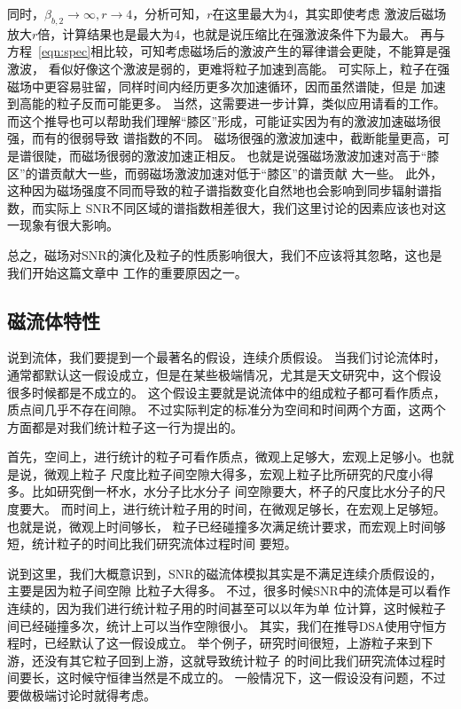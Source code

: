 同时，$\beta_{b,2}\to \infty, r\to4$，分析可知，$r$在这里最大为4，其实即使考虑
激波后磁场放大$r$倍，计算结果也是最大为4，也就是说压缩比在强激波条件下为最大。
再与方程~\ref{eqn:spec}相比较，可知考虑磁场后的激波产生的幂律谱会更陡，不能算是强激波，
看似好像这个激波是弱的，更难将粒子加速到高能。
可实际上，粒子在强磁场中更容易驻留，同样时间内经历更多次加速循环，因而虽然谱陡，但是
加速到高能的粒子反而可能更多。
当然，这需要进一步计算，类似应用请看\citet{Zirakashvili2018}的工作。
而这个推导也可以帮助我们理解“膝区”形成，可能证实因为有的激波加速磁场很强，而有的很弱导致
谱指数的不同。
磁场很强的激波加速中，截断能量更高，可是谱很陡，而磁场很弱的激波加速正相反。
也就是说强磁场激波加速对高于“膝区”的谱贡献大一些，而弱磁场激波加速对低于“膝区”的谱贡献
大一些。
此外，这种因为磁场强度不同而导致的粒子谱指数变化自然地也会影响到同步辐射谱指数，而实际上
SNR不同区域的谱指数相差很大\citep{Leahy2005, Tian2005}，我们这里讨论的因素应该也对这
一现象有很大影响。

总之，磁场对SNR的演化及粒子的性质影响很大，我们不应该将其忽略，这也是我们开始这篇文章中
工作的重要原因之一。

\subsection{磁流体特性}
说到流体，我们要提到一个最著名的假设，连续介质假设。
当我们讨论流体时，通常都默认这一假设成立，但是在某些极端情况，尤其是天文研究中，这个假设
很多时候都是不成立的。
这个假设主要就是说流体中的组成粒子都可看作质点，质点间几乎不存在间隙。
不过实际判定的标准分为空间和时间两个方面，这两个方面都是对我们统计粒子这一行为提出的。

首先，空间上，进行统计的粒子可看作质点，微观上足够大，宏观上足够小。也就是说，微观上粒子
尺度比粒子间空隙大得多，宏观上粒子比所研究的尺度小得多。比如研究倒一杯水，水分子比水分子
间空隙要大，杯子的尺度比水分子的尺度要大。
而时间上，进行统计粒子用的时间，在微观足够长，在宏观上足够短。也就是说，微观上时间够长，
粒子已经碰撞多次满足统计要求，而宏观上时间够短，统计粒子的时间比我们研究流体过程时间
要短。

说到这里，我们大概意识到，SNR的磁流体模拟其实是不满足连续介质假设的，主要是因为粒子间空隙
比粒子大得多。
不过，很多时候SNR中的流体是可以看作连续的，因为我们进行统计粒子用的时间甚至可以以年为单
位计算，这时候粒子间已经碰撞多次，统计上可以当作空隙很小。
其实，我们在推导DSA使用守恒方程时，已经默认了这一假设成立。
举个例子，研究时间很短，上游粒子来到下游，还没有其它粒子回到上游，这就导致统计粒子
的时间比我们研究流体过程时间要长，这时候守恒律当然是不成立的。
一般情况下，这一假设没有问题，不过要做极端讨论时就得考虑。

